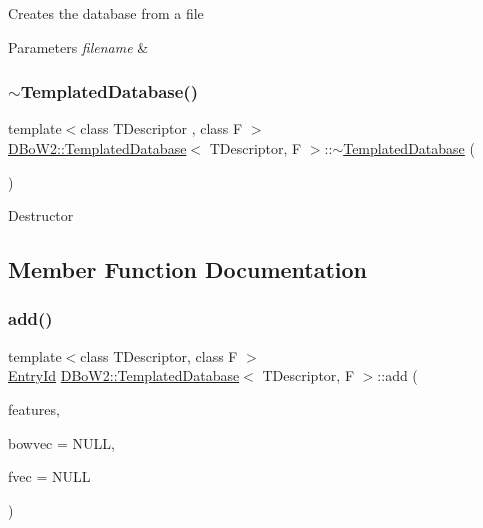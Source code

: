 Creates the database from a file 
\begin{DoxyParams}{Parameters}
{\em filename} & \\
\hline
\end{DoxyParams}
\mbox{\label{classDBoW2_1_1TemplatedDatabase_aca2f045e0974babd7ef5b491b5e24c25}} 
\subsubsection{\texorpdfstring{$\sim$\+Templated\+Database()}{~TemplatedDatabase()}}
{\footnotesize\ttfamily template$<$class T\+Descriptor , class F $>$ \\
\hyperlink{classDBoW2_1_1TemplatedDatabase}{D\+Bo\+W2\+::\+Templated\+Database}$<$ T\+Descriptor, F $>$\+::$\sim$\hyperlink{classDBoW2_1_1TemplatedDatabase}{Templated\+Database} (\begin{DoxyParamCaption}\item[{void}]{ }\end{DoxyParamCaption})\hspace{0.3cm}{\ttfamily [virtual]}}

Destructor 

\subsection{Member Function Documentation}
\mbox{\label{classDBoW2_1_1TemplatedDatabase_a7a3af9e631370017d1e54da43d9b790b}} 
\subsubsection{\texorpdfstring{add()}{add()}\hspace{0.1cm}{\footnotesize\ttfamily [1/2]}}
{\footnotesize\ttfamily template$<$class T\+Descriptor, class F $>$ \\
\hyperlink{namespaceDBoW2_a060a36cf320e6e831ee98915c19c1623}{Entry\+Id} \hyperlink{classDBoW2_1_1TemplatedDatabase}{D\+Bo\+W2\+::\+Templated\+Database}$<$ T\+Descriptor, F $>$\+::add (\begin{DoxyParamCaption}\item[{const std\+::vector$<$ T\+Descriptor $>$ \&}]{features,  }\item[{\hyperlink{classDBoW2_1_1BowVector}{Bow\+Vector} $\ast$}]{bowvec = {\ttfamily NULL},  }\item[{\hyperlink{classDBoW2_1_1FeatureVector}{Feature\+Vector} $\ast$}]{fvec = {\ttfamily NULL} }\end{DoxyParamCaption})}

